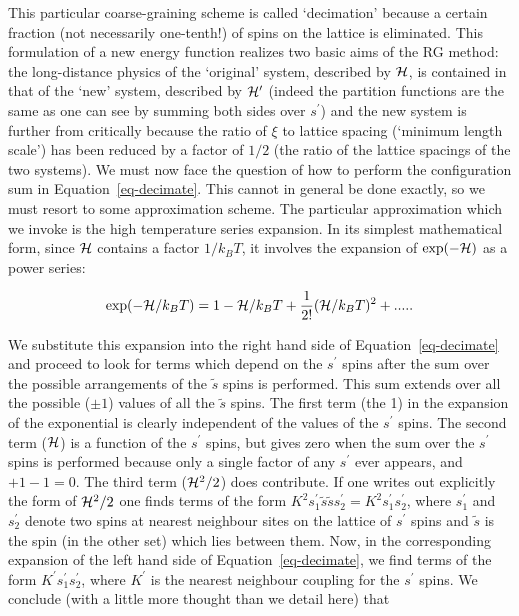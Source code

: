 \documentclass[
  letterpaper,
  enabledeprecatedfontcommands]{report}
\begin{document}
This particular coarse-graining scheme is called `decimation' because a
certain fraction (not necessarily one-tenth!) of spins on the lattice is
eliminated. This formulation of a new energy function realizes two basic
aims of the RG method: the long-distance physics of the `original'
system, described by \({\cal H}\), is contained in that of the `new'
system, described by \({\cal H}^\prime\) (indeed the partition functions
are the same as one can see by summing both sides over \(s^\prime\)) and
the new system is further from critically because the ratio of \(\xi\)
to lattice spacing (`minimum length scale') has been reduced by a factor
of \(1/2\) (the ratio of the lattice spacings of the two systems). We
must now face the question of how to perform the configuration sum in
Equation~\ref{eq-decimate}. This cannot in general be done exactly, so
we must resort to some approximation scheme. The particular
approximation which we invoke is the high temperature series expansion.
In its simplest mathematical form, since \({\cal H}\) contains a factor
\(1/k_BT\), it involves the expansion of \(\exp(-{\cal H})\) as a power
series:

\[\exp(-{\cal H}/k_BT)=1-{\cal H}/k_BT +\frac{1}{2!}({\cal H}/k_BT)^2+.....\]

We substitute this expansion into the right hand side of
Equation~\ref{eq-decimate} and proceed to look for terms which depend on
the \(s^\prime\) spins after the sum over the possible arrangements of
the \(\tilde{s}\) spins is performed. This sum extends over all the
possible (\(\pm 1\)) values of all the \(\tilde{s}\) spins. The first
term (the 1) in the expansion of the exponential is clearly independent
of the values of the \(s^\prime\) spins. The second term (\({\cal H}\))
is a function of the \(s^\prime\) spins, but gives zero when the sum
over the \(s^\prime\) spins is performed because only a single factor of
any \(s^\prime\) ever appears, and \(+ 1 - 1 = 0\). The third term
(\({\cal H}^2/2\)) does contribute. If one writes out explicitly the
form of \({\cal H}^2/2\) one finds terms of the form
\(K^2s_1^\prime\tilde{s}\tilde{s}s_2^\prime=K^2s_1^\prime s_2^\prime\),
where \(s_1^\prime\) and \(s_2^\prime\) denote two spins at nearest
neighbour sites on the lattice of \(s^\prime\) spins and \(\tilde{s}\)
is the spin (in the other set) which lies between them. Now, in the
corresponding expansion of the left hand side of
Equation~\ref{eq-decimate}, we find terms of the form
\(K^\prime s_1^\prime s_2^\prime\), where \(K^\prime\) is the nearest
neighbour coupling for the \(s^\prime\) spins. We conclude (with a
little more thought than we detail here) that
\end{document}
